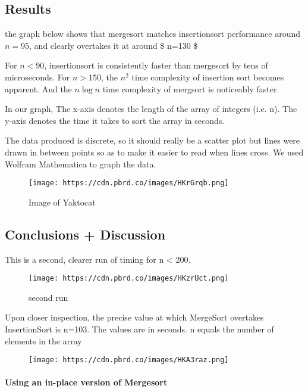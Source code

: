 \documentclass[11pt]{article}
\makeatletter
\def\maxwidth{\ifdim\Gin@nat@width>\linewidth\linewidth
    \else\Gin@nat@width\fi}
\let\Oldincludegraphics\includegraphics
\renewcommand{\includegraphics}[1]{\Oldincludegraphics[width=.8\maxwidth]{#1}}
\makeatother
\begin{document}
    \subsection{Results}\label{results}

the graph below shows that mergesort matches insertionsort performance
around \(n=95\), and clearly overtakes it at around \$ n=130 \$

For \(n < 90\), insertionsort is consistently faster than mergesort by
tens of microseconds. For \(n > 150\), the \(n^2\) time complexity of
insertion sort becomes apparent. And the \(n \log{n}\) time complexity
of mergsort is noticeably faster.

In our graph, The x-axis denotes the length of the array of integers
(i.e. n). The y-axis denotes the time it takes to sort the array in
seconds.

The data produced is discrete, so it should really be a scatter plot but
lines were drawn in between points so as to make it easier to read when
lines cross. We used Wolfram Mathematica to graph the data.

    \begin{figure}
\centering
\texttt{[image: https://cdn.pbrd.co/images/HKrGrqb.png]}
\caption{Image of Yaktocat}
\end{figure}

    \subsection{Conclusions + Discussion}\label{conclusions-discussion}

    This is a second, clearer run of timing for n \textless{} 200.

\begin{figure}
\centering
\texttt{[image: https://cdn.pbrd.co/images/HKzrUct.png]}
\caption{second run}
\end{figure}

    Upon closer inspection, the precise value at which MergeSort overtakes
InsertionSort is n=103. The values are in seconds. n equals the number
of elements in the array

\begin{figure}
\centering
\texttt{[image: https://cdn.pbrd.co/images/HKA3raz.png]}
\caption{}
\end{figure}

    \paragraph{Using an in-place version of
Mergesort}\label{using-an-in-place-version-of-mergesort}
\end{document}
